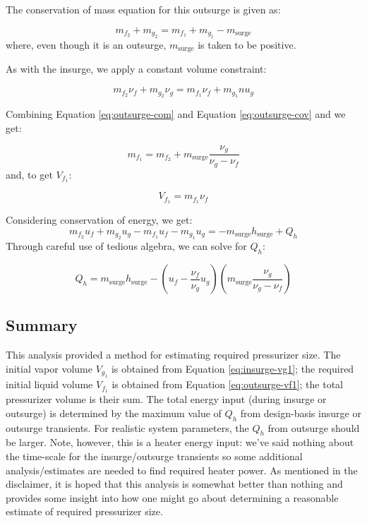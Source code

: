 The conservation of mass equation for this outsurge is given as:

\begin{equation}
m_{f_2}+m_{g_2} = m_{f_1} + m_{g_1} - m_{\text{surge}}
\label{eq:outsurge-com}
\end{equation}
where, even though it is an outsurge, $m_{\text{surge}}$ is taken to be positive.

As with the insurge, we apply a constant volume constraint:

\begin{equation}
m_{f_2}\nu_f + m_{g_2}\nu_g = m_{f_1}\nu_f + m_{g_1}nu_g
\label{eq:outsurge-cov}
\end{equation}

Combining Equation \ref{eq:outsurge-com} and Equation \ref{eq:outsurge-cov} and we get:

\begin{equation}
m_{f_1} = m_{f_2} + m_{\text{surge}}\frac{\nu_g}{\nu_g - \nu_f}
\end{equation}
and, to get $V_{f_1}$:

\begin{equation}
V_{f_1} = m_{f_1}\nu_f
\label{eq:outsurge-vf1}
\end{equation}

Considering conservation of energy, we get:
\begin{equation}
m_{f_2}u_f + m_{g_2}u_g - m_{f_1}u_f - m_{g_1} u_g = -m_{\text{surge}}h_{\text{surge}} + Q_{h}
\label{eq:outsurge-coe}
\end{equation}
Through careful use of tedious algebra, we can solve for $Q_{h}$:

\begin{equation}
Q_{h} = m_{\text{surge}}h_{\text{surge}} - \left(u_f - \frac{\nu_f}{\nu_g}u_g \right)\left(m_{\text{surge}}\frac{\nu_g}{\nu_g - \nu_f} \right)
\label{eq:outsurge-q}
\end{equation}

\subsection{Summary}
This analysis provided a method for estimating required pressurizer size.  The initial vapor volume $V_{g_1}$ is obtained from Equation \ref{eq:insurge-vg1}; the required initial liquid volume $V_{f_1}$ is obtained from Equation \ref{eq:outsurge-vf1}; the total pressurizer volume is their sum.  The total energy input (during insurge or outsurge) is determined by the maximum value of $Q_h$ from design-basis insurge or outsurge transients.  For realistic system parameters, the $Q_h$ from outsurge should be larger.  Note, however, this is a heater energy input: we've said nothing about the time-scale for the insurge/outsurge transients so some additional analysis/estimates are needed to find required heater power.  As mentioned in the disclaimer, it is hoped that this analysis is somewhat better than nothing and provides some insight into how one might go about determining a reasonable estimate of required pressurizer size.



